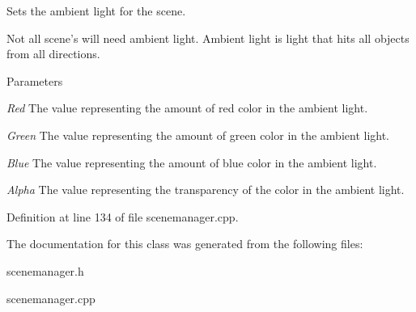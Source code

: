 Sets the ambient light for the scene. 

Not all scene's will need ambient light. Ambient light is light that hits all objects from all directions. 
\begin{DoxyParams}{Parameters}
\item[{\em Red}]The value representing the amount of red color in the ambient light. \item[{\em Green}]The value representing the amount of green color in the ambient light. \item[{\em Blue}]The value representing the amount of blue color in the ambient light. \item[{\em Alpha}]The value representing the transparency of the color in the ambient light. \end{DoxyParams}


Definition at line 134 of file scenemanager.cpp.



The documentation for this class was generated from the following files:\begin{DoxyCompactItemize}
\item 
scenemanager.h\item 
scenemanager.cpp\end{DoxyCompactItemize}
